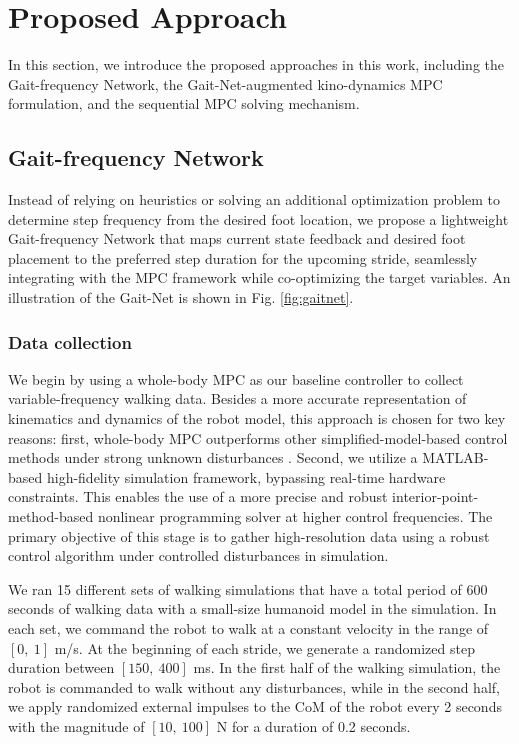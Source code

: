 \section{Proposed Approach}
\label{sec:approach}

In this section, we introduce the proposed approaches in this work, including the Gait-frequency Network, the Gait-Net-augmented 
kino-dynamics MPC formulation, and the sequential MPC solving mechanism.


\subsection{Gait-frequency Network}
\label{subsec:gaitnet}

Instead of relying on heuristics or solving an additional optimization problem to determine step frequency from the desired foot location, we propose a lightweight Gait-frequency Network that maps current state feedback and desired foot placement to the preferred step duration for the upcoming stride, seamlessly integrating with the MPC framework while co-optimizing the target variables. An illustration of the Gait-Net is shown in Fig.  \ref{fig:gaitnet}. 

\subsubsection{Data collection}
We begin by using a whole-body MPC as our baseline controller to collect variable-frequency walking data. Besides a more accurate representation of kinematics and dynamics of the robot model, this approach is chosen for two key reasons: first, whole-body MPC outperforms other simplified-model-based control methods under strong unknown disturbances \cite{dantec2024centroidal}. Second, we utilize a MATLAB-based high-fidelity simulation framework, bypassing real-time hardware constraints. This enables the use of a more precise and robust interior-point-method-based nonlinear programming solver at higher control frequencies. The primary objective of this stage is to gather high-resolution data using a robust control algorithm under controlled disturbances in simulation.

We ran 15 different sets of walking simulations that have a total period of 600 seconds of walking data with a small-size humanoid model in the simulation. In each set, we command the robot to walk at a constant velocity in the range of $[0,\:1]$ \unit{m/s}. At the beginning of each stride, we generate a randomized step duration between $[150,\:400]$ \unit{ms}. In the first half of the walking simulation, the robot is commanded to walk without any disturbances, while in the second half, we apply randomized external impulses to the CoM of the robot every 2 seconds with the magnitude of $[10,\:100]$ \unit{N} for a duration of 0.2 seconds. 

